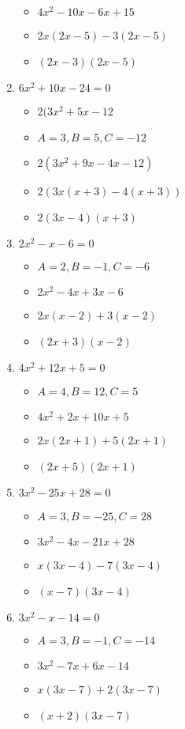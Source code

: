 \documentclass{article}
\begin{document}
\begin{enumerate}
\begin{itemize}
  \item $4x^{2}-10x-6x+15$
  \item $2x(2x-5)-3(2x-5)$
  \item $(2x-3)(2x-5)$
  \end{itemize}
\item $6x^{2} + 10x - 24 = 0$
  \begin{itemize}
  \item $2(3x^{2}+5x-12$
  \item $A=3, B=5, C=-12$
  \item $2(3x^{2}+9x-4x-12)$
  \item $2(3x(x+3)-4(x+3))$
  \item $2(3x-4)(x+3)$
  \end{itemize}
\item $2x^{2} - x - 6 = 0$
  \begin{itemize}
  \item $A=2, B=-1, C=-6$
  \item $2x^{2}-4x+3x-6$
  \item $2x(x-2)+3(x-2)$
  \item $(2x+3)(x-2)$
  \end{itemize}
\item $4x^{2} + 12x + 5 = 0$
  \begin{itemize}
  \item $A=4, B=12, C=5$
  \item $4x^{2}+2x+10x+5$
  \item $2x(2x+1)+5(2x+1)$
  \item $(2x+5)(2x+1)$
  \end{itemize}
\item $3x^{2} - 25x + 28 = 0$
  \begin{itemize}
  \item $A=3, B=-25, C=28$
  \item $3x^{2}-4x-21x+28$
  \item $x(3x-4)-7(3x-4)$
  \item $(x-7)(3x-4)$
  \end{itemize}
\item $3x^{2} - x - 14 = 0$
  \begin{itemize}
  \item $A=3, B=-1, C=-14$
  \item $3x^{2}-7x+6x-14$
  \item $x(3x-7)+2(3x-7)$
  \item $(x+2)(3x-7)$
  \end{itemize}

\end{enumerate}
\end{document}
